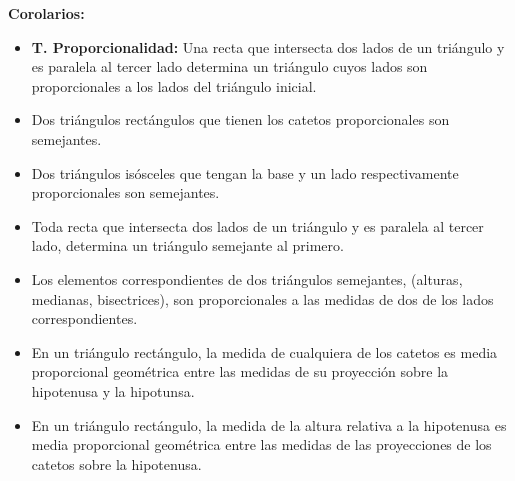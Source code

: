 \documentclass[•]{article}
\begin{document}
\begin{flushleft}
\begin{itemize}
		
			 
	\end{itemize}
	\textbf{Corolarios:}
	\begin{itemize}
		\item \textbf{T. Proporcionalidad: }Una recta que intersecta dos lados de un tri\'angulo y es paralela al tercer lado determina un tri\'angulo cuyos lados son proporcionales a los lados del tri\'angulo inicial.
		\item Dos tri\'angulos rect\'angulos que tienen los catetos proporcionales son semejantes.
		\item Dos tri\'angulos is\'osceles que tengan la base y un lado respectivamente proporcionales son semejantes.
		\item Toda recta que intersecta dos lados de un tri\'angulo y es paralela al tercer lado, determina un tri\'angulo semejante al primero.
		\item Los elementos correspondientes de dos tri\'angulos semejantes, (alturas, medianas, bisectrices), son proporcionales a las medidas de dos de los lados correspondientes.
		\item En un tri\'angulo rect\'angulo, la medida de cualquiera de los catetos es media proporcional geom\'etrica entre las medidas de su proyecci\'on sobre la hipotenusa y la hipotunsa.
		\item En un tri\'angulo rect\'angulo, la medida de la altura relativa a la hipotenusa es media proporcional geom\'etrica entre las medidas de las proyecciones de los catetos sobre la hipotenusa.
		
	\end{itemize}

\end{flushleft}
\end{document}
